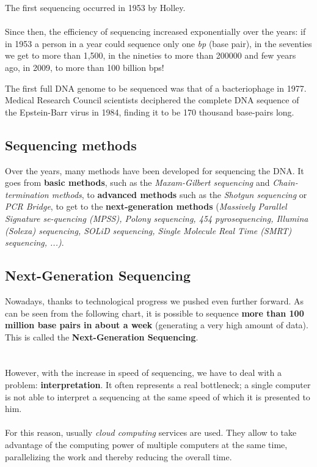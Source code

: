 The first sequencing occurred in 1953 by Holley.
\\
\\Since then, the efficiency of sequencing increased exponentially over the years: if in 1953 a person in a year could sequence only one \emph{bp} (base pair), in the seventies we get to more than 1,500, in the nineties to more than 200000 and few years ago, in 2009, to more than 100 billion bps!

\vspace{5mm}

The first full DNA genome to be sequenced was that of a bacteriophage in 1977. Medical Research Council scientists deciphered the complete DNA sequence of the Epstein-Barr virus in 1984, finding it to be 170 thousand base-pairs long.

\subsection{Sequencing methods}

Over the years, many methods have been developed for sequencing the DNA. It goes from \textbf{basic methods}, such as the \emph{Maxam-Gilbert sequencing} and \emph{Chain-termination methods}, to \textbf{advanced methods} such as the \emph{Shotgun sequencing} or \emph{PCR Bridge}, to get to the \textbf{next-generation methods} (\emph{Massively Parallel Signature se-quencing (MPSS), Polony sequencing, 454 pyrosequencing, Illumina (Solexa) sequencing, SOLiD sequencing, Single Molecule Real Time (SMRT) sequencing, ...)}.

\subsection{Next-Generation Sequencing}

Nowadays, thanks to technological progress we pushed even further forward. As can be seen from the following chart, it is possible to sequence \textbf{more than 100 million base pairs in about a week} (generating a very high amount of data). This is called the \textbf{Next-Generation Sequencing}.
\\
\\
\\However, with the increase in speed of sequencing, we have to deal with a problem:  \textbf{interpretation}. It often represents a real bottleneck; a single computer is not able to interpret a sequencing at the same speed of which it is presented to him.
\\
\\For this reason, usually \emph{cloud computing} services are used. They allow to take advantage of the computing power of multiple computers at the same time, parallelizing the work and thereby reducing the overall time.

